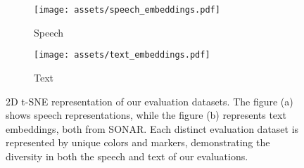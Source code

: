 
\begin{figure}[!htp]
    \centering
    \begin{subfigure}{0.24\textwidth}
        \centering
        \texttt{[image: assets/speech\_embeddings.pdf]}  %
        \caption{Speech}
        \label{fig:first_figure}
    \end{subfigure}%
    \hfill
    \begin{subfigure}{0.24\textwidth}
        \centering
        \texttt{[image: assets/text\_embeddings.pdf]}  %
        \caption{Text}
        \label{fig:second_figure}
    \end{subfigure}
    \caption{2D t-SNE representation of our evaluation datasets. The figure (a) shows speech representations, while the figure (b) represents text embeddings, both from SONAR. Each distinct evaluation dataset is represented by unique colors and markers, demonstrating the diversity in both the speech and text of our evaluations.}
    \label{fig:speech_text_embeddings}
\end{figure}
